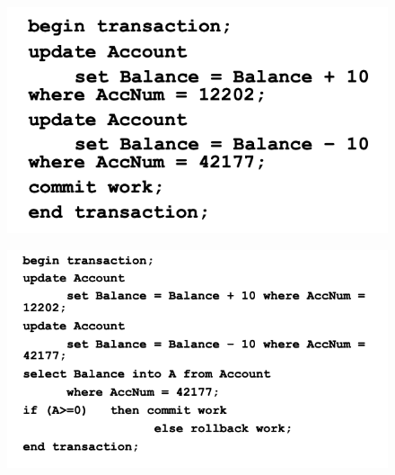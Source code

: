 \documentclass[10pt,a4paper]{article}
\begin{document}
\begin{figure}[h!]
\centering
\begin{minipage}{.5\textwidth}
  \centering
   \includegraphics[width=.7\linewidth]{images/transaction-ex}
  \label{fig:t1}
\end{minipage}%
\begin{minipage}{.5\textwidth}
  \centering
  \includegraphics[width=.7\linewidth]{images/transaction-ex2}
  \label{fig:t2}
\end{minipage}
\end{figure} 
\end{document}
